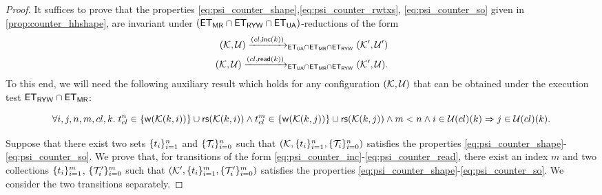 \begin{proof}
It suffices to prove that the properties \eqref{eq:psi_counter_shape},\eqref{eq:psi_counter_rwtxs}, 
\eqref{eq:psi_counter_so} given in \cref{prop:counter_hhshape}, are invariant under 
$(\mathsf{ET}_{\mathsf{MR}} \cap \mathsf{ET}_{\mathsf{RYW}} \cap \mathsf{ET}_{\mathsf{UA}})$-reductions of the form 
\begin{align}
(\hh, \viewFun) \xrightarrow{(\cl, \mathsf{inc}(\ke))}_{\ET_{\UA} \cap \ET_{\MRd} \cap \ET_{\RYW}} (\hh', \viewFun') \label{eq:psi_counter_inc}\\
(\hh, \viewFun) \xrightarrow{(\cl, \mathsf{read}(\ke))}_{\ET_{\UA} \cap \ET_{\MRd} \cap \ET_{\RYW}} (\hh', \viewFun). \label{eq:psi_counter_read}
\end{align}
To this end, we will need the following auxiliary result which holds for any configuration $(\mathcal{K}, \mathcal{U})$ 
that can be obtained under the execution test $\mathsf{ET}_{\mathsf{RYW}} \cap \mathsf{ET}_{\mathsf{MR}}$:


\begin{equation}
\forall i, j, n,m, \cl, \ke. \; \txid_{\cl}^{n} \in \{\WTx(\hh(\ke, i))\} \cup \RTx(\hh(\ke, i)) 
\wedge \txid_{\cl}^{m} \in \{\WTx(\hh(\ke, j))\} \cup \RTx(\hh(\ke, j)) \wedge m < n 
\wedge i \in \viewFun(\cl)(\ke) \implies 
j \in \viewFun(\cl)(\ke). \label{eq:psi_counter_view}
\end{equation} 

Suppose that there exist two sets $\{t_{i}\}_{i=1}^{n}$ and 
$\{\mathcal{T}_{i}\}_{i=0}^{n}$ such that $(\mathcal{K}, \{t_{i}\}_{i=1}^{n}, \{\mathcal{T}_{i}\}_{i=0}^{n})$ 
satisfies the properties \eqref{eq:psi_counter_shape}-\eqref{eq:psi_counter_so}. 
We prove that, for transitions of the form \eqref{eq:psi_counter_inc}-\eqref{eq:psi_counter_read}, 
there exist an index $m$ and two collections $\{t_{i}\}_{i=1}^{m}$, $\{\mathcal{T}'_{i}\}_{i=0}^{m}$ 
such that $(\mathcal{K}', \{t_{i}\}_{i=1}^{m}, \{\mathcal{T}'_{i}\}_{i=0}^{m})$ satisfies the properties 
\eqref{eq:psi_counter_shape}-\eqref{eq:psi_counter_so}. We consider the two transitions separately.


\end{proof}
